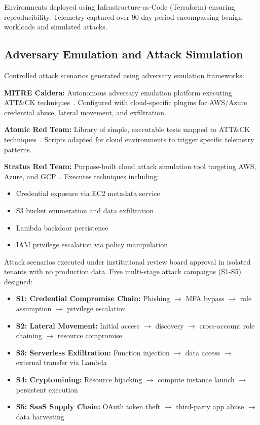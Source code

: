 Environments deployed using Infrastructure-as-Code (Terraform) ensuring reproducibility. Telemetry captured over 90-day period encompassing benign workloads and simulated attacks.

\subsection{Adversary Emulation and Attack Simulation}
Controlled attack scenarios generated using adversary emulation frameworks:

\textbf{MITRE Caldera:} Autonomous adversary emulation platform executing ATT\&CK techniques~\cite{mitrecaldera2023}. Configured with cloud-specific plugins for AWS/Azure credential abuse, lateral movement, and exfiltration.

\textbf{Atomic Red Team:} Library of simple, executable tests mapped to ATT\&CK techniques~\cite{atomicredteam2023}. Scripts adapted for cloud environments to trigger specific telemetry patterns.

\textbf{Stratus Red Team:} Purpose-built cloud attack simulation tool targeting AWS, Azure, and GCP~\cite{stratusredteam2023}. Executes techniques including:
\begin{itemize}
    \item Credential exposure via EC2 metadata service
    \item S3 bucket enumeration and data exfiltration
    \item Lambda backdoor persistence
    \item IAM privilege escalation via policy manipulation
\end{itemize}

Attack scenarios executed under institutional review board approval in isolated tenants with no production data. Five multi-stage attack campaigns (S1-S5) designed:
\begin{itemize}
    \item \textbf{S1: Credential Compromise Chain:} Phishing $\rightarrow$ MFA bypass $\rightarrow$ role assumption $\rightarrow$ privilege escalation
    \item \textbf{S2: Lateral Movement:} Initial access $\rightarrow$ discovery $\rightarrow$ cross-account role chaining $\rightarrow$ resource compromise
    \item \textbf{S3: Serverless Exfiltration:} Function injection $\rightarrow$ data access $\rightarrow$ external transfer via Lambda
    \item \textbf{S4: Cryptomining:} Resource hijacking $\rightarrow$ compute instance launch $\rightarrow$ persistent execution
    \item \textbf{S5: SaaS Supply Chain:} OAuth token theft $\rightarrow$ third-party app abuse $\rightarrow$ data harvesting
\end{itemize}

